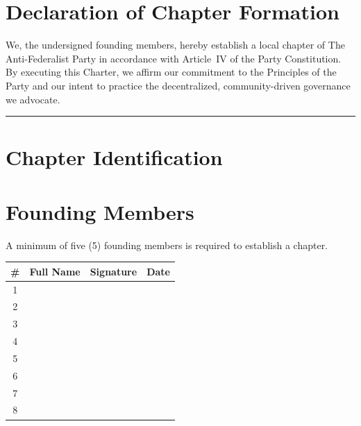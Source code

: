 \documentclass[11pt, letterpaper]{article}
\begin{document}

\section*{Declaration of Chapter Formation}

We, the undersigned founding members, hereby establish a local chapter of The Anti-Federalist Party in accordance with Article~IV of the Party Constitution. By executing this Charter, we affirm our commitment to the Principles of the Party and our intent to practice the decentralized, community-driven governance we advocate.

\vspace{1.5em}
\begin{center}
{\color{afp-teal}\rule{8cm}{0.5pt}}
\end{center}
\vspace{1em}

\section{Chapter Identification}


\section{Founding Members}

A minimum of five (5) founding members is required to establish a chapter.

\vspace{0.5em}
\begin{center}
\begin{tabularx}{\textwidth}{|c|X|X|X|}
\hline
\rowcolor{afp-teal!10}
\textbf{\#} & \textbf{Full Name} & \textbf{Signature} & \textbf{Date} \\
\hline
1 & & & \\[1cm] \hline
2 & & & \\[1cm] \hline
3 & & & \\[1cm] \hline
4 & & & \\[1cm] \hline
5 & & & \\[1cm] \hline
6 & & & \\[1cm] \hline
7 & & & \\[1cm] \hline
8 & & & \\[1cm] \hline
\end{tabularx}
\end{center}
\end{document}

